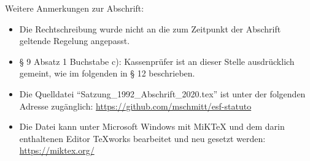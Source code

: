 \documentclass[11pt]{article}
\begin{document}
\begin{appendix}
Weitere Anmerkungen zur Abschrift:
\begin{itemize}
	\item Die Rechtschreibung wurde nicht an die zum Zeitpunkt der Abschrift geltende Regelung angepasst.
	\item § 9 Absatz 1 Buchstabe c): Kassenprüfer ist an dieser Stelle ausdrücklich gemeint, wie im folgenden in § 12 beschrieben.
	\item Die Quelldatei "`Satzung_1992_Abschrift_2020.tex"' ist unter der folgenden Adresse zugänglich: \url{https://github.com/mschmitt/esf-statuto}
	\item Die Datei kann unter Microsoft Windows mit MiKTeX und dem darin enthaltenen Editor TeXworks bearbeitet und neu gesetzt werden: \url{https://miktex.org/}
\end{itemize}

\end{appendix}
\end{document}
